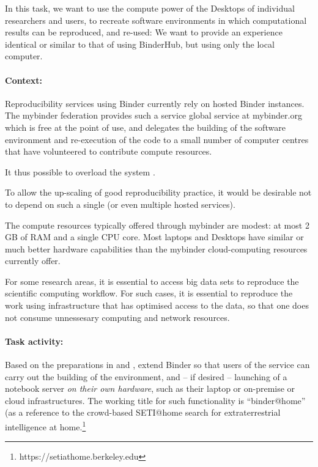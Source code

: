 \begin{task}[
  title=Binder@Home,
  id=binder-at-home,
  lead=SRL,
  PM=7,
  partners={MP,UIO}
]
In this task, we want to use the compute power of the Desktops of individual researchers and
users, to recreate software environments in which computational results can be
reproduced, and re-used: We want to provide an experience identical or similar
to that of using BinderHub, but using only the local computer.

\paragraph*{Context:} Reproducibility services using Binder currently rely on hosted Binder instances.
The mybinder federation provides such a service global service at mybinder.org
which is free at
the point of use, and delegates the building of the software environment and
re-execution of the code to a small number of computer centres that have
volunteered to contribute compute resources.

It thus possible to overload the system .

To allow the up-scaling of good reproducibility practice, it would be
desirable not to depend on such a single (or even multiple hosted services).

The compute resources typically offered through mybinder are modest: at most 2 GB of RAM
and a single CPU core.
Most laptops and Desktops have similar or much better hardware capabilities than
the mybinder cloud-computing resources currently offer.

For some research areas, it is essential to access big data sets to reproduce the scientific computing workflow.  For such cases, it is essential to reproduce the work using infrastructure that has optimised access to the data, so that one does not consume unnessesary computing and network resources.  

\paragraph*{Task activity:} Based on the preparations in  and
, extend Binder so that users of the service can
carry out the building of the environment, and -- if desired -- launching of a
notebook server \emph{on their own hardware}, such as their laptop or on-premise or cloud infrastructures.   The working title for such
functionality is ``binder@home'' (as a reference to the crowd-based SETI@home search for
extraterrestrial intelligence at home.\footnote{https://setiathome.berkeley.edu}


\end{task}
